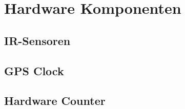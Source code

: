 \section{Hardware Komponenten}
\subsection{IR-Sensoren}
\subsection{GPS Clock}
\subsection{Hardware Counter}
